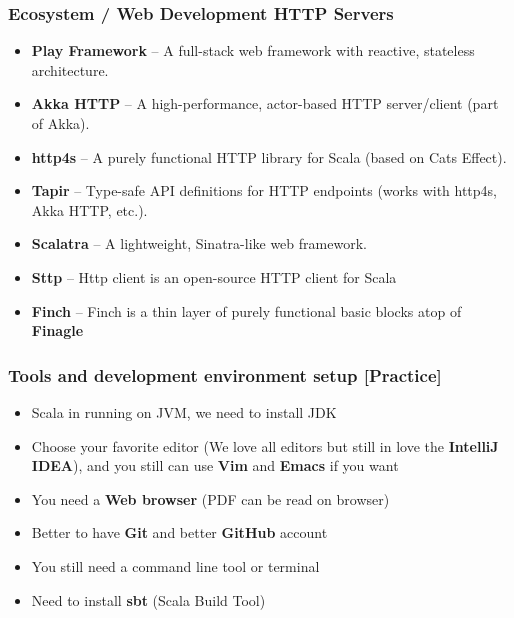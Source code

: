 \documentclass{beamer}
\begin{document}

\begin{frame}
\frametitle{Ecosystem / Web Development \text{\&} HTTP Servers }

\begin{itemize}
    \item \textbf{Play Framework} – A full-stack web framework with reactive, stateless architecture.
    \item \textbf{Akka HTTP} – A high-performance, actor-based HTTP server/client (part of Akka).
    \item \textbf{http4s} – A purely functional HTTP library for Scala (based on Cats Effect).
    \item \textbf{Tapir} – Type-safe API definitions for HTTP endpoints (works with http4s, Akka HTTP, etc.).
    \item \textbf{Scalatra} – A lightweight, Sinatra-like web framework.
    \item \textbf{Sttp} – Http client is an open-source HTTP client for Scala
    \item \textbf{Finch} – Finch is a thin layer of purely functional basic blocks atop of \textbf{Finagle}
\end{itemize}

\end{frame}

\begin{frame}
\frametitle{Tools and development environment setup [Practice]}

\begin{itemize}
    \item Scala in running on JVM, we need to install JDK 
    \item Choose your favorite editor (We love all editors but still in love the \textbf{IntelliJ IDEA}), and you still can use \textbf{Vim} and \textbf{Emacs} if you want
    \item You need a \textbf{Web browser} (PDF can be read on browser) 
    \item Better to have \textbf{Git} and better \textbf{GitHub} account
    \item You still need a command line tool or terminal
    \item Need to install \textbf{sbt} (Scala Build Tool)
\end{itemize}
\end{frame}
\end{document}
